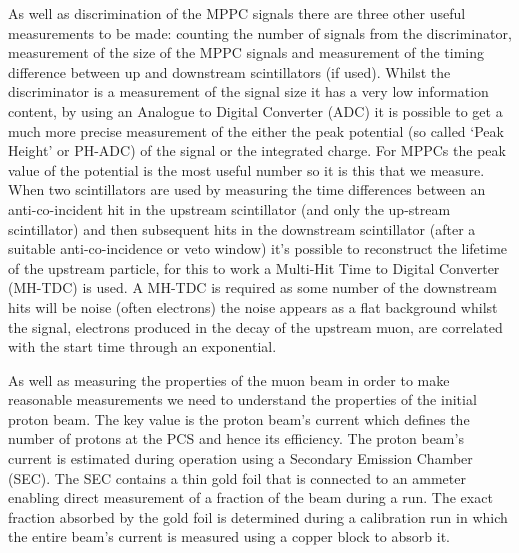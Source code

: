 
As well as discrimination of the MPPC signals there are three other useful measurements to be made: counting the number of signals from the discriminator, measurement of the size of the MPPC signals and measurement of the timing difference between up and downstream scintillators (if used). Whilst the discriminator is a measurement of the signal size it has a very low information content, by using an Analogue to Digital Converter (ADC) it is possible to get a much more precise measurement of the either the peak potential (so called `Peak Height' or PH-ADC) of the signal or the integrated charge. For MPPCs the peak value of the potential is the most useful number so it is this that we measure. When two scintillators are used by measuring the time differences between an anti-co-incident hit in the upstream scintillator (and only the up-stream scintillator) and then subsequent hits in the downstream scintillator (after a suitable anti-co-incidence or veto window) it's possible to reconstruct the lifetime of the upstream particle, for this to work a Multi-Hit Time to Digital Converter (MH-TDC) is used. A MH-TDC is required as some number of the downstream hits will be noise (often electrons) the noise appears as a flat background whilst the signal, electrons produced in the decay of the upstream muon, are correlated with the start time through an exponential. 

As well as measuring the properties of the muon beam in order to make reasonable measurements we need to understand the properties of the initial proton beam. The key value is the proton beam's current which defines the number of protons at the PCS and hence its efficiency. The proton beam's current is estimated during operation using a Secondary Emission Chamber (SEC). The SEC contains a thin gold foil that is connected to an ammeter enabling direct measurement of a fraction of the beam during a run. The exact fraction absorbed by the gold foil is determined during a calibration run in which the entire beam's current is measured using a copper block to absorb it.

